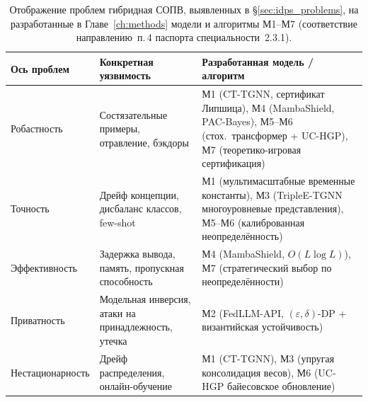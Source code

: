 \begin{table}[H]
\centering
\caption{Отображение проблем гибридная СОПВ, выявленных в \S\ref{sec:idps_problems}, на разработанные в Главе~\ref{ch:methods} модели и алгоритмы М1--М7 (соответствие направлению~п.\,4 паспорта специальности~2.3.1).}
\label{tab:models_to_methods}
\small
\setlength{\tabcolsep}{4pt}
\begin{tabular}{p{3.0cm} p{4.5cm} p{6.5cm}}
\toprule
\textbf{Ось проблем} & \textbf{Конкретная уязвимость} & \textbf{Разработанная модель / алгоритм} \\
\midrule
Робастность     & Состязательные примеры, отравление, бэкдоры
                & М1 (CT-TGNN, сертификат Липшица), М4 (MambaShield, PAC-Bayes), М5--М6 (стох.\ трансформер + UC-HGP), М7 (теоретико-игровая сертификация) \\
\addlinespace
Точность        & Дрейф концепции, дисбаланс классов, few-shot
                & М1 (мультимасштабные временные константы), М3 (TripleE-TGNN многоуровневые представления), М5--М6 (калиброванная неопределённость) \\
\addlinespace
Эффективность   & Задержка вывода, память, пропускная способность
                & М4 (MambaShield, $O(L\log L)$), М7 (стратегический выбор по неопределённости) \\
\addlinespace
Приватность     & Модельная инверсия, атаки на принадлежность, утечка
                & М2 (FedLLM-API, $(\varepsilon,\delta)$-DP + византийская устойчивость) \\
\addlinespace
Нестационарность & Дрейф распределения, онлайн-обучение
                & М1 (CT-TGNN), М3 (упругая консолидация весов), М6 (UC-HGP байесовское обновление) \\
\bottomrule
\end{tabular}
\end{table}

